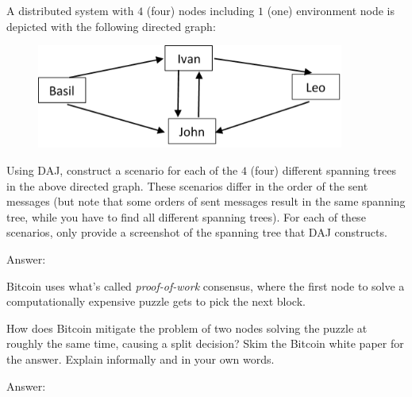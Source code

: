 \documentclass{article}
\begin{document}
\begin{Question} 
    A distributed system with $4$ (four) nodes including $1$ (one) environment node is depicted with the following directed graph:
\begin{figure}[H]
    \centering 
    \includegraphics[width=0.9\textwidth]{DV_demand2}
\end{figure}
Using DAJ, construct a scenario for each of the $4$ (four) different spanning trees in the above directed graph. These scenarios differ in the order of the sent messages (but note that some orders of sent messages result in the same spanning tree, while you have to find all different spanning trees). For each of these scenarios, only provide a screenshot of the spanning tree that DAJ constructs.
    
\begin{answer}
    Answer:
    \begin{quote}
        
    \end{quote}
\end{answer}
\end{Question}


\clearpage
\setcounter{question}{2}

\begin{Question} 
    Bitcoin uses what's called \textit{proof-of-work} consensus, where the first node to solve a computationally expensive puzzle gets to pick the next block.

    How does Bitcoin mitigate the problem of two nodes solving the puzzle at roughly the same time, causing a split decision? Skim the Bitcoin white paper for the answer. Explain informally and in your own words.

\begin{answer}
    Answer:
    \begin{quote}
        
    \end{quote}
\end{answer}
\end{Question}
\end{document}
